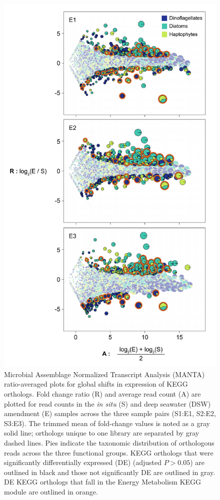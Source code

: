 \begin{figure}[p!]
  \centering
    \includegraphics[width=.7\textwidth]{Images/C4_FigureS6.pdf}
    \caption[Microbial Assemblage Normalized Transcript Analysis (MANTA) ratio-averaged plots for global shifts in expression of KEGG orthologs]{Microbial Assemblage Normalized Transcript Analysis (MANTA) ratio-averaged plots for global shifts in expression of KEGG orthologs. Fold change ratio (R) and average read count (A) are plotted for read counts in the \emph{in situ} (S) and deep seawater (DSW) amendment (E) samples across the three sample pairs (S1:E1, S2:E2, S3:E3). The trimmed mean of fold-change values is noted as a gray solid line; orthologs unique to one library are separated by gray dashed lines. Pies indicate the taxonomic distribution of orthologous reads across the three functional groups. KEGG orthologs that were significantly differentially expressed (DE) (adjusted $P > 0.05$) are outlined in black and those not significantly DE are outlined in gray. DE KEGG orthologs that fall in the Energy Metabolism KEGG module are outlined in orange.}
  \label{fig:a4f6}
\end{figure}

